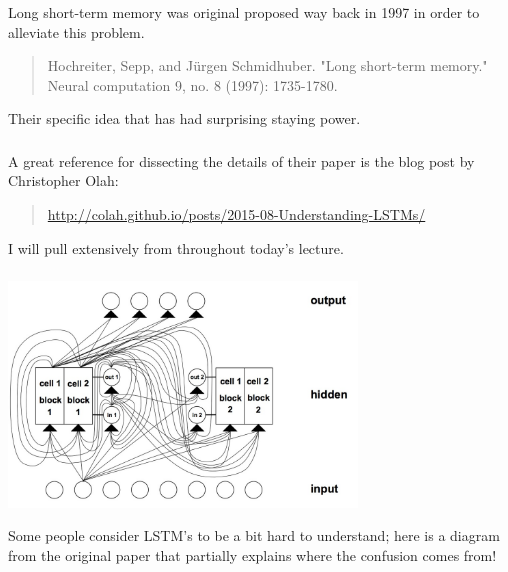 \documentclass[xetex,mathserif,serif,aspectratio=169]{beamer}
\begin{document}
\begin{frame}[fragile] \frametitle{} \oldB \small

Long short-term memory was original proposed way
back in 1997 in order to alleviate this problem.
\begin{quote}
Hochreiter, Sepp, and Jürgen Schmidhuber. "Long
short-term memory." Neural computation 9, no. 8 (1997):
1735-1780.
\end{quote}
Their specific idea that has had surprising staying power.

\end{frame}

\begin{frame}[fragile] \frametitle{} \oldB \small

A great reference for dissecting the details of their
paper is the blog post by Christopher Olah:
\begin{quote}
\url{http://colah.github.io/posts/2015-08-Understanding-LSTMs/}
\end{quote}
I will pull extensively from throughout today's lecture.

\end{frame}

\begin{frame}[fragile] \frametitle{} \oldB \small

\begin{center}
\includegraphics[height=6cm]{img/lstmPaperImg.jpg}
\end{center}

Some people consider LSTM's to be a bit hard to understand;
here is a diagram from the original paper that partially
explains where the confusion comes from!

\end{frame}
\end{document}
